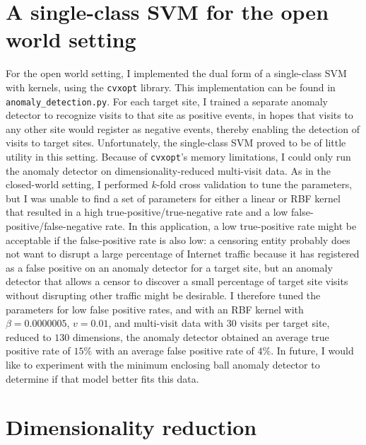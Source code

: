 \documentclass[10pt, twocolumn]{article}
\begin{document}
\section{A single-class SVM for the open world setting}

For the open world setting, I implemented the dual form of a single-class SVM with kernels, using the 
\texttt{cvxopt} library. This implementation can be found in \texttt{anomaly\_detection.py}. For each target site, I trained 
a separate anomaly detector to recognize visits to that site as positive events, in hopes that visits to any other site 
would register as negative events, thereby enabling the detection of visits to target sites. Unfortunately, the single-class
SVM proved to be of little utility in this setting. Because of \texttt{cvxopt}'s memory limitations, I could only run the 
anomaly detector on dimensionality-reduced multi-visit data. As in the closed-world setting, I performed $k$-fold cross 
validation to tune the parameters, but I was unable to find a set of parameters for either a linear or RBF kernel that resulted 
in a high true-positive/true-negative rate and a low false-positive/false-negative rate. In this application, a low true-positive 
rate might be acceptable if the false-positive rate is also low: a censoring entity probably does not want to disrupt a large 
percentage of Internet traffic because it has registered as a false positive on an anomaly detector for a target site, but an 
anomaly detector that allows a censor to discover a small percentage of target site visits without disrupting other traffic 
might be desirable. I therefore tuned the parameters for low false positive rates, and with an RBF kernel with $\beta=0.0000005$, $v=0.01$, and multi-visit data with 30 visits per target site, reduced to $130$ dimensions, the anomaly detector obtained an average true positive 
rate of $15\%$ with an average false positive rate of $4\%$. In future, I would like to experiment with the minimum enclosing ball 
anomaly detector to determine if that model better fits this data.

\section{Dimensionality reduction}
\label{sec:dimred}
\end{document}
